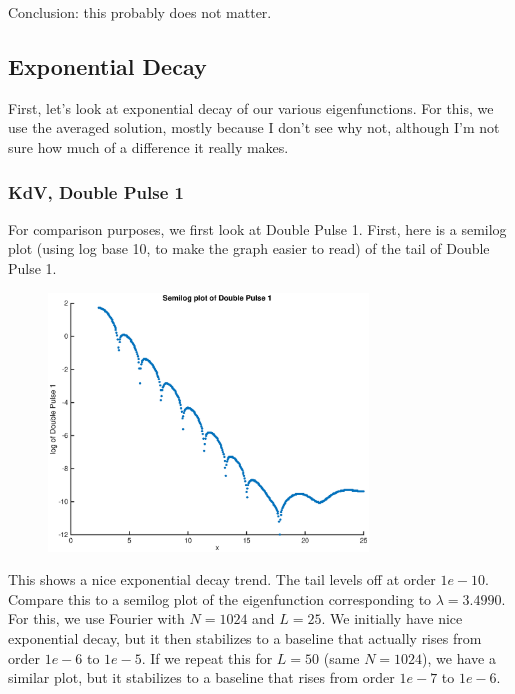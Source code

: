 \documentclass[12pt]{article}
\begin{document}
Conclusion: this probably does not matter. 

\subsection*{Exponential Decay}
First, let's look at exponential decay of our various eigenfunctions. For this, we use the averaged solution, mostly because I don't see why not, although I'm not sure how much of a difference it really makes.

\subsubsection*{KdV, Double Pulse 1}
For comparison purposes, we first look at Double Pulse 1. First, here is a semilog plot (using log base 10, to make the graph easier to read) of the tail of Double Pulse 1.
\begin{figure}[H]
\includegraphics[width=8.5cm]{1doublesemilog}
\end{figure}
This shows a nice exponential decay trend. The tail levels off at order $1e-10$.\\

Compare this to a semilog plot of the eigenfunction corresponding to $\lambda = 3.4990$. For this, we use Fourier with $N = 1024$ and $L=25$. We initially have nice exponential decay, but it then stabilizes to a baseline that actually rises from order $1e-6$ to $1e-5$. If we repeat this for $L = 50$ (same $N=1024$), we have a similar plot, but it stabilizes to a baseline that rises from order $1e-7$ to $1e-6$.
\end{document}
